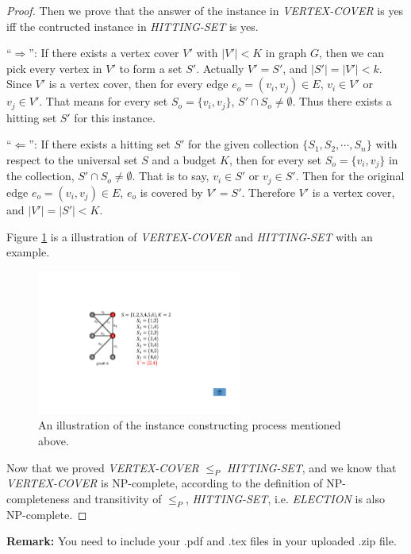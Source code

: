 \documentclass[12pt,a4paper]{article}
\theoremstyle{definition}
\begin{document}
\begin{enumerate}
\begin{proof}
    Then we prove that the answer of the instance in \emph{VERTEX-COVER} is yes iff the contructed instance in \emph{HITTING-SET} is yes.

    ``$\Rightarrow$'': If there exists a vertex cover $V'$ with $|V'|<K$ in graph $G$, then we can pick every vertex in $V'$ to form a set $S'$. Actually $V'=S'$, and $|S'|=|V'|<k$. Since $V'$ is a vertex cover, then for every edge $e_o=(v_i,v_j)\in E$, $v_i\in V'$ or $v_j\in V'$. That means for every set $S_o=\{v_i,v_j\}$, $S'\cap S_o\neq \emptyset$. Thus there exists a hitting set $S'$ for this instance.

    ``$\Leftarrow$'': If there exists a hitting set $S'$ for the given collection $\{S_1,S_2,\cdots,S_n\}$ with respect to the universal set $S$ and a budget $K$, then for every set $S_o=\{v_i,v_j\}$ in the collection, $S'\cap S_o\neq \emptyset$. That is to say, $v_i\in S'$ or $v_j\in S'$. Then for the original edge $e_o=(v_i,v_j)\in E$, $e_o$ is covered by $V'=S'$. Therefore $V'$ is a vertex cover, and $|V'|=|S'|<K$.

    Figure \ref{fig-hitting} is a illustration of \emph{VERTEX-COVER} and \emph{HITTING-SET} with an example.
    \begin{figure}[ht]
        \centering
            \includegraphics[width=0.6\textwidth]{Fig-hitting_set.pdf}
            \caption{An illustration of the instance constructing process mentioned above.}\label{fig-hitting}
    \end{figure}

    Now that we proved \emph{VERTEX-COVER} $\leq_P$ \emph{HITTING-SET}, and we know that \emph{VERTEX-COVER} is NP-complete, according to the definition of NP-completeness and transitivity of $\leq_P$,  \emph{HITTING-SET}, i.e. \emph{ELECTION} is also NP-complete.
\end{proof}
\end{enumerate}
\vspace{20pt}

\textbf{Remark:} You need to include your .pdf and .tex files in your uploaded .zip file.

\end{document}
